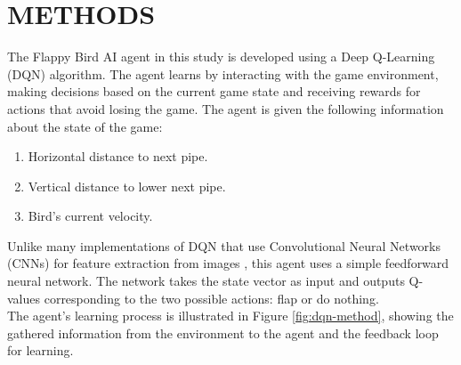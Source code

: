 \documentclass{lutmscthesis}[2017/10/03]
\begin{document}



\section{METHODS}
The Flappy Bird AI agent in this study is developed using a Deep Q-Learning (DQN) algorithm. The agent learns by interacting with the game environment, making decisions based on the current game state and receiving rewards for actions that avoid losing the game. The agent is given the following information about the state of the game:
\begin{enumerate}
    \item Horizontal distance to next pipe.
    \item Vertical distance to lower next pipe.
    \item Bird's current velocity.
\end{enumerate}
Unlike many implementations of DQN that use Convolutional Neural Networks (CNNs) for feature extraction from images \cite{dutta2018reinforcement}, this agent uses a simple feedforward neural network. The network takes the state vector as input and outputs Q-values corresponding to the two possible actions: flap or do nothing. \\ The agent's learning process is illustrated in Figure \ref{fig:dqn-method}, showing the gathered information from the environment to the agent and the feedback loop for learning.
\end{document}
